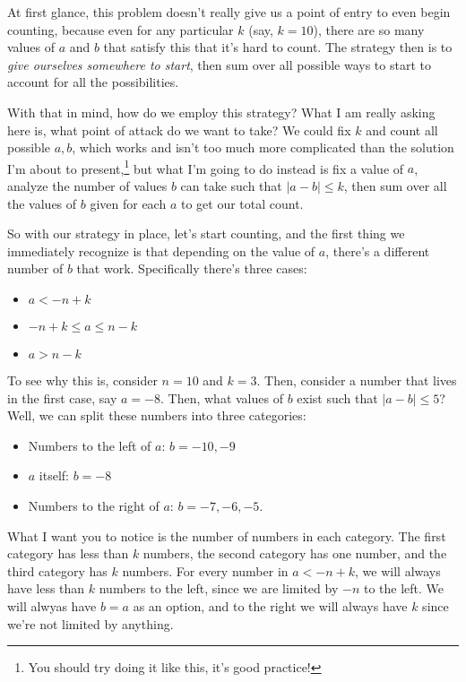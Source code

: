 \documentclass[10pt]{article}
\begin{document}
	\begin{solution}
		At first glance, this problem doesn't really give us a point of entry to even begin counting, because even for 
		any particular \( k \) (say, \( k = 10 \)), there are so many values of \( a \) and \( b \) that satisfy this 
		that it's hard to count. The strategy then is to \textit{give ourselves somewhere to start}, then sum over 
		all possible ways to start to account for all the possibilities.

		With that in mind, how do we employ this strategy? What I am really asking here is, what point of 
		attack do we want to take? We could fix \( k \) and count all possible \( a, b \), which works and isn't too 
		much more complicated than the solution I'm about to present,\footnote{You should try doing it like this, 
		it's good practice!} but what I'm going to do instead is fix a value of \( a \), analyze 
		the number of values \( b \) can take such that \( |a - b| \le k \), then sum over all the values of 
		\( b \) given for each \( a \) to get our total count.

		So with our strategy in place, let's start counting, and the first thing we immediately recognize is that 
		depending on the value of \( a \), there's a different number of \( b \) that work. Specifically there's 
		three cases:
		\begin{itemize}
			\item \( a < -n + k \)
			\item \( -n + k \le  a \le  n - k \) 
			\item \( a > n-k \)
		\end{itemize}
		To see why this is, consider \( n = 10 \) and \( k = 3 \). Then, consider a number that lives in the first 
		case, say \( a = -8 \). Then, what values of \( b \) exist such that \( |a - b| \le 5 \)? Well, we can 
		split these numbers into three categories:
		\begin{itemize}
			\item Numbers to the left of \( a \): \( b = -10, -9 \) 
			\item \( a \) itself: \( b = -8 \) 
			\item Numbers to the right of  \( a \): \( b = -7, -6, -5 \). 
		\end{itemize}
		What I want you to notice is the number of numbers in each category. The first category has less than \( k \)
		numbers, the second category has one number, and the third category has \( k \) numbers. For every number 
		in \( a < -n + k \), we will always have less than \( k \) numbers to the left, since we are limited 
		by \( -n \) to the left. We will alwyas have \( b = a\) as an option, and to the right we will always have 
		\( k \) since we're not limited by anything. 


\end{solution}
\end{document}
